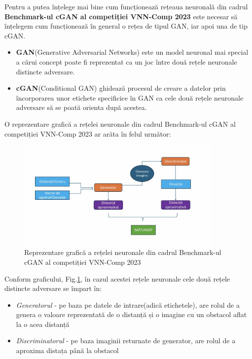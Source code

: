 \hspace{0.5 cm}
Pentru a putea înțelege mai bine cum funcționează rețeaua neuronală din cadrul \textbf{Benchmark-ul cGAN al competiției VNN-Comp 2023} este necesar să înțelegem cum funcționează în general o rețea de tipul GAN, iar apoi una de tip cGAN.
\begin{itemize}
    \item \textbf{GAN}(Generative Adversarial Networks) este un model neuronal mai special \cite{GAN} a cărui concept poate fi reprezentat ca un joc între două rețele neuronale distincte adversare.

    \item \textbf{cGAN}(Conditional GAN) \cite{CGAN} ghidează procesul de creare a datelor prin încorporarea unor etichete specificice în GAN ca cele două rețele neuronale adversare să se poată orienta după acestea.
\newline
\end{itemize}

O reprezentare grafică a rețelei neuronale din cadrul Benchmark-ul cGAN al competiției VNN-Comp 2023 ar arăta în felul următor:

\begin{figure}[ht]
\centering
\includegraphics[width=10cm]{imagini/introducere/slide1Ale.jpeg}
\caption{Reprezentare grafică a rețelei neuronale din cadrul Benchmark-ul cGAN al competiției VNN-Comp 2023}
\label{reprezentare_grafica_cGAN}
\end{figure}



Conform graficului, Fig.\ref{reprezentare_grafica_cGAN}, în cazul acestei rețele neuronale cele două rețele distincte adversare se împart în:

\begin{itemize}
  \item \textit{Generatorul} - pe baza pe datele de intrare(adică etichetele), are rolul de a genera o valoare reprezentată de o distanță și o imagine cu un obstacol aflat la o acea distanță
  
  \item \textit{Discriminatorul} - pe baza imaginii returnate de generator, are rolul de a aproxima distața până la obstacol
\end{itemize}

